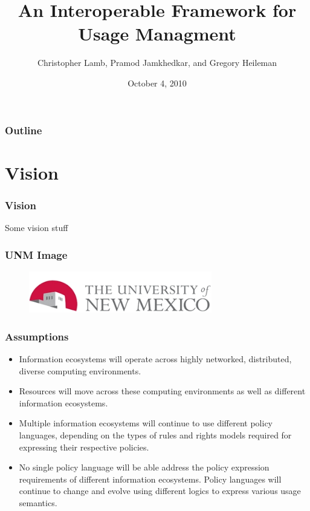 \documentclass[t, 10pt]{beamer}
\title{An Interoperable Framework for Usage Managment}
\author [Chris]{Christopher Lamb, Pramod Jamkhedkar, and Gregory Heileman}
\institute[University of New Mexico]{
\inst {}Department of Electrical and Computer Engineering\\
University of New Mexico}
\date{October 4, 2010}
\begin{document}
\begin{frame}
\titlepage
\end{frame}


\begin{frame}
\frametitle{Outline}
\tableofcontents 
\end{frame}

\section{Vision}
\begin{frame}
\frametitle{Vision}
Some vision stuff
\end{frame}

\begin{frame}
\frametitle{UNM Image}

\begin{figure} 
\includegraphics[width = 8cm]{UNM}
\end{figure}
 
\end{frame}

\begin{frame}
\frametitle{Assumptions}

\begin{itemize}
	\item Information ecosystems will operate across highly networked,
distributed, diverse computing environments.
\pause
	\item Resources will move across these computing environments
as well as different information ecosystems.
\pause
	\item Multiple information ecosystems will continue to use different
policy languages, depending on the types of rules and
rights models required for expressing their respective policies.
\pause
	\item No single policy language will be able address the policy expression
requirements of different information ecosystems.
Policy languages will continue to change and evolve using
different logics to express various usage semantics.
\end{itemize}

\end{frame}

%
%
\end{document}
